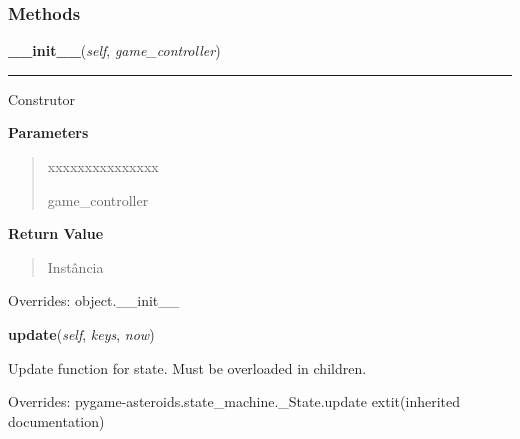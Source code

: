 
  \subsubsection{Methods}

    \vspace{0.5ex}

\hspace{.8\funcindent}\begin{boxedminipage}{\funcwidth}

    \raggedright \textbf{\_\_init\_\_}(\textit{self}, \textit{game\_controller})

    \vspace{-1.5ex}

    \rule{\textwidth}{0.5\fboxrule}
\setlength{\parskip}{2ex}
    Construtor

\setlength{\parskip}{1ex}
      \textbf{Parameters}
      \vspace{-1ex}

      \begin{quote}
        \begin{Ventry}{xxxxxxxxxxxxxxx}

          \item[game\_controller]

        \end{Ventry}

      \end{quote}

      \textbf{Return Value}
    \vspace{-1ex}

      \begin{quote}
      Instância

      \end{quote}

      Overrides: object.\_\_init\_\_

    \end{boxedminipage}

    \vspace{0.5ex}

\hspace{.8\funcindent}\begin{boxedminipage}{\funcwidth}

    \raggedright \textbf{update}(\textit{self}, \textit{keys}, \textit{now})

\setlength{\parskip}{2ex}
    Update function for state.  Must be overloaded in children.

\setlength{\parskip}{1ex}
      Overrides: pygame-asteroids.state\_machine.\_State.update 	extit{(inherited documentation)}

    \end{boxedminipage}

